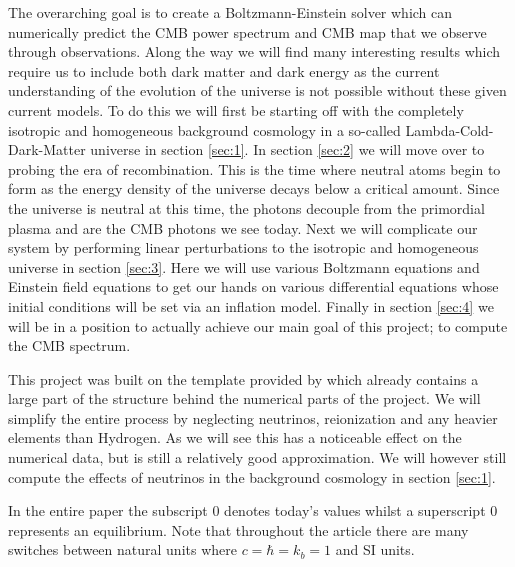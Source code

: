 \documentclass[%
reprint,
 amsmath,amssymb,
 aps,
]{revtex4-2}
\begin{document}
The overarching goal is to create a Boltzmann-Einstein solver which can numerically predict the CMB power spectrum and CMB map that we observe through observations. Along the way we will find many interesting results which require us to include both dark matter and dark energy as the current understanding of the evolution of the universe is not possible without these given current models. To do this we will first be starting off with the completely isotropic and homogeneous background cosmology in a so-called Lambda-Cold-Dark-Matter universe in section \ref{sec:1}. In section \ref{sec:2} we will move over to probing the era of recombination. This is the time where neutral atoms begin to form as the energy density of the universe decays below a critical amount. Since the universe is neutral at this time, the photons decouple from the primordial plasma and are the CMB photons we see today. Next we will complicate our system by performing linear perturbations to the isotropic and homogeneous universe in section \ref{sec:3}. Here we will use various Boltzmann equations and Einstein field equations to get our hands on various differential equations whose initial conditions will be set via an inflation model. Finally in section \ref{sec:4} we will be in a position to actually achieve our main goal of this project; to compute the CMB spectrum.

This project was built on the template provided by \cite{AST5220LectureNotes} which already contains a large part of the structure behind the numerical parts of the project. We will simplify the entire process by neglecting neutrinos, reionization and any heavier elements than Hydrogen. As we will see this has a noticeable effect on the numerical data, but is still a relatively good approximation. We will however still compute the effects of neutrinos in the background cosmology in section \ref{sec:1}.

 In the entire paper the subscript 0 denotes today's values whilst a superscript 0 represents an equilibrium. Note that throughout the article there are many switches between natural units where $c=\hbar=k_b=1$ and SI units. 









\end{document}
